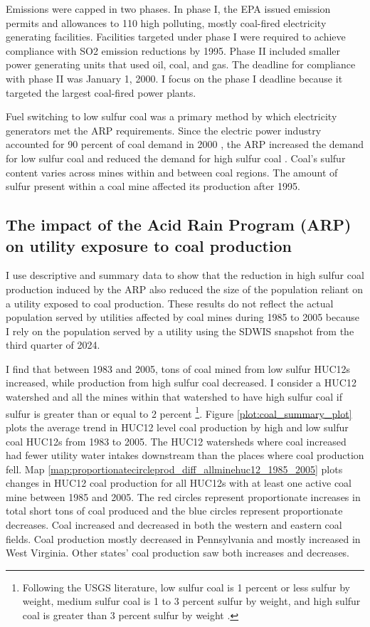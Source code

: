 \documentclass{article}
\begin{document}
Emissions were capped in two phases. In phase I, the EPA issued emission permits and allowances to 110 high polluting, mostly coal-fired electricity generating facilities. Facilities targeted under phase I were required to achieve compliance with SO2 emission reductions by 1995. Phase II included smaller power generating units that used oil, coal, and gas. The deadline for compliance with phase II was January 1, 2000. I focus on the phase I deadline because it targeted the largest coal-fired power plants.

Fuel switching to low sulfur coal was a primary method by which electricity generators met the ARP requirements. Since the electric power industry accounted for 90 percent of coal demand in 2000 \parencite{freme2000us}, the ARP increased the demand for low sulfur coal and reduced the demand for high sulfur coal \parencite{epaarpcoalemp,stratford2015coalprod}. Coal's sulfur content varies across mines within and between coal regions. The amount of sulfur present within a coal mine affected its production after 1995.

\subsection{The impact of the Acid Rain Program (ARP) on utility exposure to coal production}

I use descriptive and summary data to show that the reduction in high sulfur coal production induced by the ARP also reduced the size of the population reliant on a utility exposed to coal production. These results do not reflect the actual population served by utilities affected by coal mines during 1985 to 2005 because I rely on the population served by a utility using the SDWIS snapshot from the third quarter of 2024.

I find that between 1983 and 2005, tons of coal mined from low sulfur HUC12s increased, while production from high sulfur coal decreased. I consider a HUC12 watershed and all the mines within that watershed to have high sulfur coal if sulfur is greater than or equal to 2 percent \footnote{Following the USGS literature, low sulfur coal is 1 percent or less sulfur by weight, medium sulfur coal is 1 to 3 percent sulfur by weight, and high sulfur coal is greater than 3 percent sulfur by weight \parencite{schweinfurth2009introduction}.}. Figure \ref{plot:coal_summary_plot} plots the average trend in HUC12 level coal production by high and low sulfur coal HUC12s from 1983 to 2005. The HUC12 watersheds where coal increased had fewer utility water intakes downstream than the places where coal production fell. Map \ref{map:proportionatecircleprod_diff_allminehuc12_1985_2005} plots changes in HUC12 coal production for all HUC12s with at least one active coal mine between 1985 and 2005. The red circles represent proportionate increases in total short tons of coal produced and the blue circles represent proportionate decreases. Coal increased and decreased in both the western and eastern coal fields. Coal production mostly decreased in Pennsylvania and mostly increased in West Virginia. Other states' coal production saw both increases and decreases.
\end{document}
